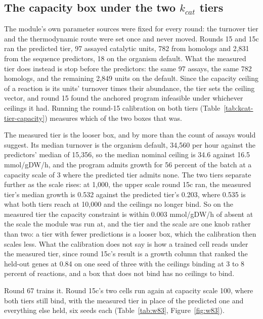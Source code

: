 \subsection{The capacity box under the two $k_{cat}$ tiers}
\label{sec:kcat-tier}

The module's own parameter sources were fixed for every round: the turnover tier and the
thermodynamic route were set once and never moved. Rounds 15 and 15c ran the predicted
tier, 97 assayed catalytic units, 782 from homologs and 2,831 from the sequence
predictors, 18 on the organism default. What the measured tier does instead is stop
before the predictors: the same 97 assays, the same 782 homologs, and the remaining
2,849 units on the default. Since the capacity ceiling of a reaction is its units'
turnover times their abundance, the tier sets the ceiling vector, and round 15 found
the anchored program infeasible under whichever ceilings it had. Running the round-15
calibration on both tiers (Table~\ref{tab:kcat-tier-capacity}) measures which of the
two boxes that was.



The measured tier is the looser box, and by more than the count of assays would
suggest. Its median turnover is the organism default, 34,560 per hour against the
predictors' median of 15,356, so the median nominal ceiling is 34.6 against 16.5
mmol/gDW/h, and the program admits growth for 56 percent of the batch at a capacity
scale of 3 where the predicted tier admits none. The two tiers separate further as the
scale rises: at 1,000, the upper scale round 15c ran, the measured tier's median
growth is 0.532 against the predicted tier's 0.203, where 0.535 is what both tiers
reach at 10,000 and the ceilings no longer bind. So on the measured tier the
capacity constraint is within 0.003 mmol/gDW/h of absent at the scale the module was
run at, and the tier and the scale are one knob rather than two: a tier with fewer
predictions is a looser box, which the calibration then scales less. What the
calibration does not say is how a trained cell reads under the measured tier, since
round 15c's result is a growth column that ranked the held-out genes at 0.84 on one
seed of three with the ceilings binding at 3 to 8 percent of reactions, and a box that
does not bind has no ceilings to bind.

Round 67 trains it. Round 15c's two cells run again at capacity scale 100, where both
tiers still bind, with the measured tier in place of the predicted one and everything
else held, six seeds each (Table~\ref{tab:w83}, Figure~\ref{fig:w83}).

